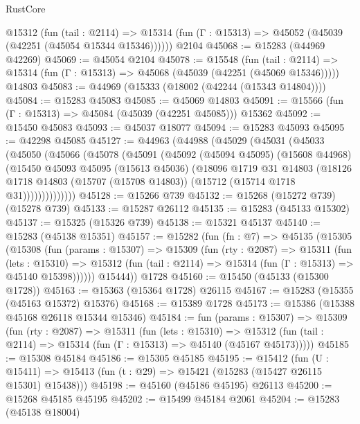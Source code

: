 \begin{lexlean}{RustCore}
\begin{coremodule}
    @15312
      (fun (tail : @2114) =>
      @15314 (fun (Γ : @15313) => @45052 (@45039 (@42251 (@45054 @15344 @15346))))))
    @2104
@45068 := @15283 (@44969 @42269)
@45069 := @45054 @2104
@45078 := @15548
    (fun (tail : @2114) => @15314 (fun (Γ : @15313) => @45068 (@45039 (@42251 (@45069 @15346)))))
    @14803
@45083 := @44969 (@15333 (@18002 (@42244 (@15343 @14804))))
@45084 := @15283 @45083
@45085 := @45069 @14803
@45091 := @15566 (fun (Γ : @15313) => @45084 (@45039 (@42251 @45085))) @15362
@45092 := @15450 @45083
@45093 := @45037 @18077
@45094 := @15283 @45093
@45095 := @42298 @45085
@45127 := @44963
    (@44988
      (@45029
        (@45031
          (@45033
            (@45050
              (@45066
                (@45078
                  (@45091
                    (@45092
                      (@45094 @45095)
                      (@15608 @44968)
                      (@15450
                        @45093
                        @45095
                        (@15613 @45036)
                        (@18096
                          @1719
                          @31
                          @14803
                          (@18126
                            @1718
                            @14803
                            (@15707 (@15708 @14803))
                            (@15712 (@15714 @1718 @31))))))))))))))
@45128 := @15266 @739
@45132 := @15268 (@15272 @739) (@15278 @739)
@45133 := @15287 @26112
@45135 := @15283 (@45133 @15302)
@45137 := @15325 (@15326 @739)
@45138 := @15321 @45137
@45140 := @15283 (@45138 @15351)
@45157 := @15282
    (fun (fn : @7) =>
    @45135
      (@15305
        (@15308
          (fun (params : @15307) =>
          @15309
            (fun (rty : @2087) =>
            @15311
              (fun (lets : @15310) =>
              @15312 (fun (tail : @2114) => @15314 (fun (Γ : @15313) => @45140 @15398))))))
        @15444))
    @1728
@45160 := @15450 (@45133 (@15300 @1728))
@45163 := @15363 (@15364 @1728) @26115
@45167 := @15283 (@15355 (@45163 @15372) @15376)
@45168 := @15389 @1728
@45173 := @15386 (@15388 @45168 @26118 @15344 @15346)
@45184 := fun (params : @15307) =>
  @15309
    (fun (rty : @2087) =>
    @15311
      (fun (lets : @15310) =>
      @15312 (fun (tail : @2114) => @15314 (fun (Γ : @15313) => @45140 (@45167 @45173)))))
@45185 := @15308 @45184
@45186 := @15305 @45185
@45195 := @15412
    (fun (U : @15411) => @15413 (fun (t : @29) => @15421 (@15283 (@15427 @26115 @15301) @15438)))
@45198 := @45160 (@45186 @45195) @26113
@45200 := @15268 @45185 @45195
@45202 := @15499 @45184 @2061
@45204 := @15283 (@45138 @18004)

\end{coremodule}
\end{lexlean}
